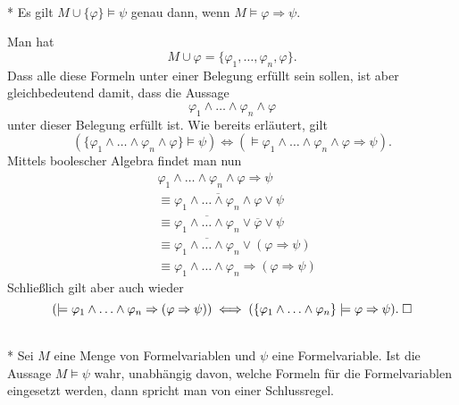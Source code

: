 \begin{Satz}[Deduktionstheorem]\mbox{}\\*
Es gilt $M\cup\{\varphi\}\models\psi$ genau dann, wenn
$M\models\varphi\Rightarrow\psi$.
\end{Satz}
 Man hat
\begin{equation}
M\cup\varphi = \{\varphi_1,\ldots,\varphi_n,\varphi\}.
\end{equation}
Dass alle diese Formeln unter einer Belegung erfüllt sein sollen,
ist aber gleichbedeutend damit, dass die Aussage%
\begin{equation}
\varphi_1\land\ldots\land\varphi_n\land\varphi
\end{equation}
unter dieser Belegung erfüllt ist. Wie bereits erläutert, gilt%
\begin{equation}
(\{\varphi_1\land\ldots\land\varphi_n\land\varphi\}\models\psi)
\iff (\models \varphi_1\land\ldots\land\varphi_n\land\varphi\Rightarrow\psi).
\end{equation}
Mittels boolescher Algebra findet man nun
\begin{align}
& \varphi_1\land\ldots\land\varphi_n\land\varphi\Rightarrow\psi\\
& \equiv \overline{\varphi_1\land\ldots\land\varphi_n\land\varphi}\lor\psi\\
& \equiv \overline{\varphi_1\land\ldots\land\varphi_n}\lor\overline\varphi\lor\psi\\
& \equiv \overline{\varphi_1\land\ldots\land\varphi_n}\lor(\varphi\Rightarrow\psi)\\
& \equiv \varphi_1\land\ldots\land\varphi_n\Rightarrow (\varphi\Rightarrow\psi)
\end{align}
Schließlich gilt aber auch wieder
\begin{equation}
(\models \varphi_1\land\ldots\land\varphi_n\Rightarrow(\varphi\Rightarrow\psi))
\iff (\{\varphi_1\land\ldots\land\varphi_n\}\models\varphi\Rightarrow\psi).\;\Box
\end{equation}

\newpage
\begin{Definition}[Schlussregel]\mbox{}\\*
Sei $M$ eine Menge von Formelvariablen und $\psi$ eine Formelvariable.
Ist die Aussage $M\models\psi$ wahr, unabhängig davon, welche
Formeln für die Formelvariablen eingesetzt werden, dann spricht man
von einer Schlussregel.
\end{Definition}

